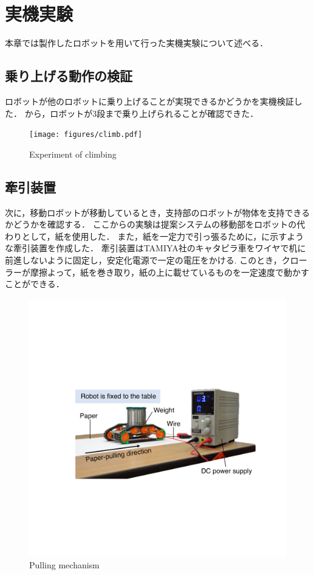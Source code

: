 \section{実機実験}
本章では製作したロボットを用いて行った実機実験について述べる．

\subsection{乗り上げる動作の検証}
ロボットが他のロボットに乗り上げることが実現できるかどうかを実機検証した．
から，ロボットが3段まで乗り上げられることが確認できた．
\begin{figure}[tb]
  \centering
  \texttt{[image: figures/climb.pdf]}
  \caption{Experiment of climbing}
  \label{fig:climb}
\end{figure}

\subsection*{牽引装置}
次に，移動ロボットが移動しているとき，支持部のロボットが物体を支持できるかどうかを確認する．
ここからの実験は提案システムの移動部をロボットの代わりとして，紙を使用した．
また，紙を一定力で引っ張るために，に示すような牽引装置を作成した．
牽引装置はTAMIYA社のキャタピラ車をワイヤで机に前進しないように固定し，安定化電源で一定の電圧をかける. このとき，クローラーが摩擦よって，紙を巻き取り，紙の上に載せているものを一定速度で動かすことができる．
\begin{figure}[tb]
  \centering
  \includegraphics[width=0.85\columnwidth]{figures/pulling-mechanism.pdf}
  \caption{Pulling mechanism}
  \label{fig:pulling-mechanism}
\end{figure}
